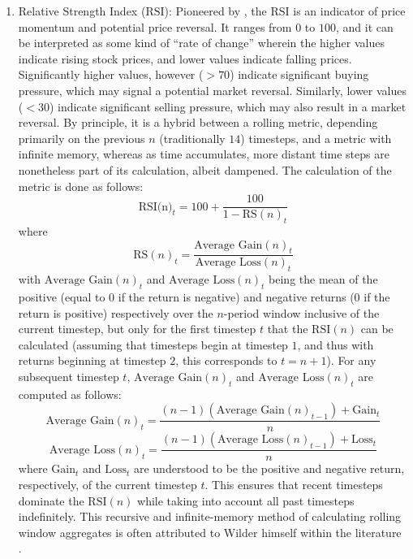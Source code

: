 \documentclass[stu,floatsintext]{apa7}
\begin{document}
\begin{enumerate}
\item Relative Strength Index ($\text{RSI}$): Pioneered by \textcite{wilder1978new}, the RSI is an indicator of price momentum and potential price reversal. It ranges from $0$ to $100$, and it can be interpreted as some kind of “rate of change” wherein the higher values indicate rising stock prices, and lower values indicate falling prices. Significantly higher values, however ($> 70$) indicate significant buying pressure, which may signal a potential market reversal. Similarly, lower values ($< 30$) indicate significant selling pressure, which may also result in a market reversal. By principle, it is a hybrid between a rolling metric, depending primarily on the previous $n$ (traditionally $14$) timesteps, and a metric with infinite memory, whereas as time accumulates, more distant time steps are nonetheless part of its calculation, albeit dampened. The calculation of the metric is done as follows:
\begin{equation}\text{RSI(n)}_t=100+\frac{100}{1-\text{RS}(n)_t}\end{equation}
where
\begin{equation}\text{RS}(n)_t=\frac{\text{Average Gain}(n)_t}{\text{Average Loss}(n)_t}\end{equation}
with $\text{Average Gain}(n)_t$ and $\text{Average Loss}(n)_t$ being the mean of the positive (equal to $0$ if the return is negative) and negative returns ($0$ if the return is positive) respectively over the $n$-period window inclusive of the current timestep, but only for the first timestep $t$ that the $\text{RSI}(n)$ can be calculated (assuming that timesteps begin at timestep $1$, and thus with returns beginning at timestep $2$, this corresponds to $t=n+1$). For any subsequent timestep $t$, $\text{Average Gain}(n)_t$ and $\text{Average Loss}(n)_t$ are computed as follows:
\begin{equation}\text{Average Gain}(n)_t=\frac{(n-1)\left(\text{Average Gain}(n)_{t-1}\right)+\text{Gain}_t}{n}\end{equation}
\begin{equation}\text{Average Loss}(n)_t=\frac{(n-1)\left(\text{Average Loss}(n)_{t-1}\right)+\text{Loss}_t}{n}\end{equation}
where $\text{Gain}_t$ and $\text{Loss}_t$ are understood to be the positive and negative return, respectively, of the current timestep $t$. This ensures that recent timesteps dominate the $\text{RSI}(n)$ while taking into account all past timesteps indefinitely. This recursive and infinite-memory method of calculating rolling window aggregates is often attributed to Wilder himself within the literature \textcite{gurrib2018performance}.

\end{enumerate}
\end{document}
